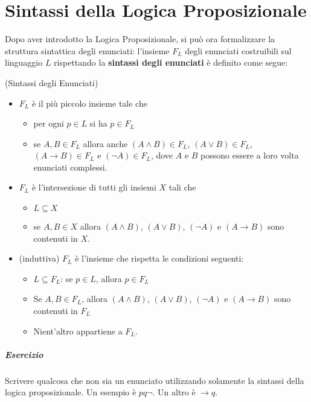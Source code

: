 \chapter{Sintassi della Logica Proposizionale}

Dopo aver introdotto la Logica Proposizionale, si può 
ora formalizzare la struttura sintattica degli enunciati: 
l'insieme $F_{L}$ degli enunciati costruibili 
sul linguaggio $L$ rispettando la \textbf{sintassi 
degli enunciati} è definito come segue: 

\begin{defi}{(Sintassi degli Enunciati)}
\begin{itemize}
  \setlength\itemsep{0pt}
 \item $F_L$ è il più piccolo insieme tale che 
    \begin{itemize}
      \item per ogni $p \in L$ si ha $p \in F_L$
      \item se $A,B \in F_L$ allora anche $(A\land B) \in F_L$, $(A\lor B) \in F_L$, 
        $(A \rightarrow B) \in F_L$ e $(\neg A) \in F_L$, dove $A$ e $B$ possono 
        essere a loro volta enunciati complessi. 
      \end{itemize}
  \item $F_L$ è l'intersezione di tutti gli insiemi $X$ tali che 
    \begin{itemize}
      \item $L \subseteq X$
      \item se $A,B \in X$ allora $(A\land B)$, $(A\lor B)$, $(\neg A)$ e 
        $(A \rightarrow B)$ sono contenuti in $X$. 
    \end{itemize}
  \item (induttiva) $F_L$ è l'insieme che rispetta le condizioni seguenti: 
    \begin{itemize}
      \item $L \subseteq F_L$: se $p \in L$, allora $p \in F_L$
      \item Se $A,B \in F_L$, allora $(A\land B)$, $(A\lor B)$, $(\neg A)$ e 
        $(A \rightarrow B)$ sono contenuti in $F_L$
      \item Nient'altro appartiene a $F_L$.
    \end{itemize}
\end{itemize}
\end{defi}
\paragraph{Esercizio}
Scrivere qualcosa che non sia un enunciato utilizzando solamente la sintassi della 
logica proposizionale. Un esempio è $p q \neg$. Un altro è $\rightarrow q$.

